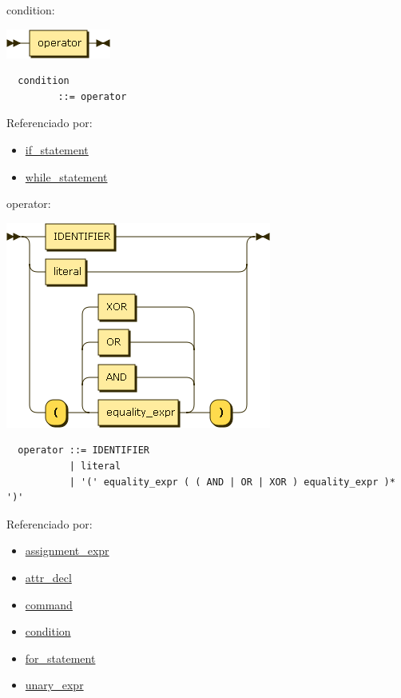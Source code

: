 \begin{minipage}{\textwidth}
  \protect\hypertarget{condition}{}{condition:}

  \includegraphics[width=1.35417in,height=0.37500in]{diagram/condition.png}

  \begin{verbatim}
  condition
         ::= operator
  \end{verbatim}

  Referenciado por:

  \begin{itemize}
      \tightlist%
    \item
      \protect\hyperlink{if_statement}{if\_statement}
    \item
      \protect\hyperlink{while_statement}{while\_statement}
  \end{itemize}

  \clearpage
\end{minipage}

\begin{minipage}{\textwidth}
  \protect\hypertarget{operator}{}{operator:}

  \includegraphics[width=3.43750in,height=2.66667in]{diagram/operator.png}

  \begin{verbatim}
  operator ::= IDENTIFIER
           | literal
           | '(' equality_expr ( ( AND | OR | XOR ) equality_expr )* ')'
  \end{verbatim}

  Referenciado por:

  \begin{itemize}
      \tightlist%
    \item
      \protect\hyperlink{assignment_expr}{assignment\_expr}
    \item
      \protect\hyperlink{attr_decl}{attr\_decl}
    \item
      \protect\hyperlink{command}{command}
    \item
      \protect\hyperlink{condition}{condition}
    \item
      \protect\hyperlink{for_statement}{for\_statement}
    \item
      \protect\hyperlink{unary_expr}{unary\_expr}
  \end{itemize}

\end{minipage}


